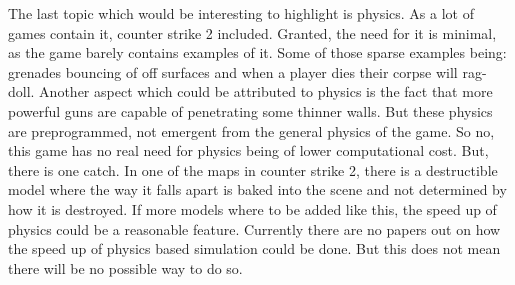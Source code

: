 The last topic which would be interesting to highlight is physics. As a lot of games contain it, counter strike 2 included. Granted, the need for it is minimal, as the game barely contains examples of it. Some of those sparse examples being: grenades bouncing of off surfaces and when a player dies their corpse will rag-doll. Another aspect which could be attributed to physics is the fact that more powerful guns are capable of penetrating some thinner walls. But these physics are preprogrammed, not emergent from the general physics of the game. So no, this game has no real need for physics being of lower computational cost. But, there is one catch. In one of the maps in counter strike 2, there is a destructible model where the way it falls apart is baked into the scene and not determined by how it is destroyed. If more models where to be added like this, the speed up of physics could be a reasonable feature. Currently there are no papers out on how the speed up of physics based simulation could be done. But this does not mean there will be no possible way to do so. 